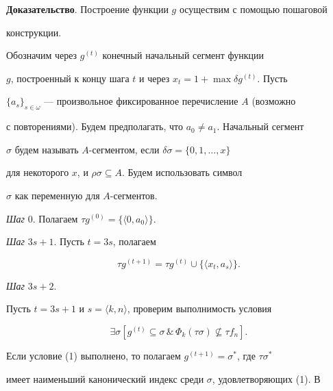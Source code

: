 {\bf Доказательство}. Построение функции $g$ осуществим с помощью пошаговой


конструкции.


Обозначим через $g^{(t)}$ конечный начальный сегмент функции


$g$, построенный к концу шага $t$ и через $x_t=1+\max\delta g^{(t)}$. Пусть


$\{a_s\}_{s\in\omega}$ --- произвольное фиксированное перечисление $A$ (возможно


с повторениями). Будем предполагать, что $a_0\neq a_1$. Начальный сегмент


$\sigma$ будем называть $A$-сегментом, если $\delta\sigma=\{0,1,\dotsc,x\}$


для некоторого $x$, и $\rho\sigma\subseteq A$. Будем использовать символ


$\sigma$ как переменную для $A$-сегментов.


\smallskip





{\it Шаг} 0. Полагаем $\tau g^{(0)}=\{\langle 0,a_0\rangle\}$.


\smallskip





{\it Шаг} $3s+1$. Пусть $t=3s$, полагаем


\begin{equation*}  %


\tau g^{(t+1)}=\tau g^{(t)}\cup\{\langle x_t,a_s\rangle\}.


\end{equation*}


\smallskip





{\it Шаг} $3s+2$.


Пусть $t=3s+1$ и $s=\langle k,n\rangle$, проверим выполнимость условия


\begin{equation} \label{l12}


\exists\sigma[g^{(t)}\subseteq\sigma\,\&\,


\Phi_k(\tau\sigma)\not\subseteq\tau f_n].


\end{equation}


Если условие (1) выполнено, то полагаем $g^{(t+1)}=\sigma^*$, где $\tau\sigma^*$


имеет наименьший канонический индекс среди $\sigma$, удовлетворяющих (1). В


